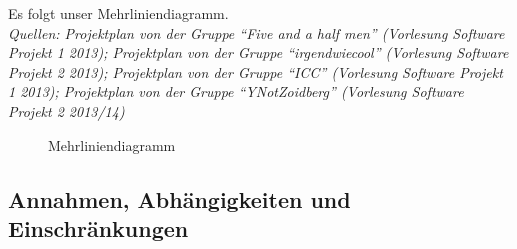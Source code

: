 Es folgt unser Mehrliniendiagramm.\\
\textit{Quellen: Projektplan von der Gruppe ``Five and a half men'' (Vorlesung Software Projekt 1 2013); Projektplan von der Gruppe ``irgendwiecool'' (Vorlesung Software Projekt 2 2013); Projektplan von der Gruppe ``ICC'' (Vorlesung Software Projekt 1 2013);  Projektplan von der Gruppe ``YNotZoidberg'' (Vorlesung Software Projekt 2 2013/14)}
\newpage
\begin{figure}[h!]
\caption{Mehrliniendiagramm}
\label{Bild:image}
\end{figure}


\subsection{Annahmen, Abhängigkeiten und Einschränkungen}

